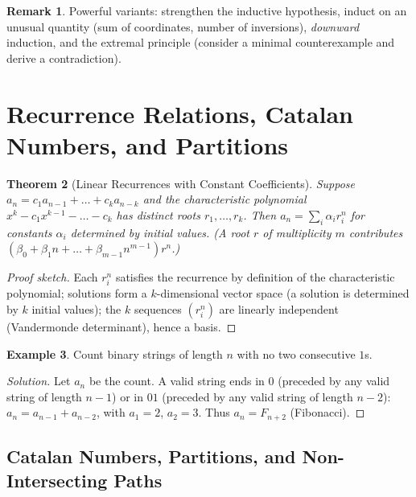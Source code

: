 \documentclass[11pt]{article}
\theoremstyle{plain}
\newtheorem{theorem}{Theorem}[section]
\theoremstyle{definition}
\newtheorem{example}[theorem]{Example}
\newtheorem{remark}[theorem]{Remark}
\newenvironment{solution}{\begin{proof}[Solution]}{\end{proof}}
\begin{document}
\begin{remark}
Powerful variants: strengthen the inductive hypothesis, induct on an unusual quantity (sum of coordinates, number
of inversions), \emph{downward} induction, and the extremal principle
(consider a minimal counterexample and derive a contradiction).
\end{remark}

\section{Recurrence Relations, Catalan Numbers, and Partitions}

\begin{theorem}[Linear Recurrences with Constant Coefficients]
Suppose $a_{n} = c_1 a_{n-1} + \dots + c_k a_{n-k}$ and the characteristic
polynomial $x^k - c_1x^{k-1} - \dots - c_k$ has distinct roots
$r_1,\dots,r_k$. Then $a_n = \sum_i \alpha_i r_i^n$ for constants $\alpha_i$
determined by initial values. (A root $r$ of multiplicity $m$ contributes
$(\beta_0 + \beta_1 n + \dots + \beta_{m-1}n^{m-1})r^n$.)
\end{theorem}
\begin{proof}[Proof sketch]
Each $r_i^n$ satisfies the recurrence by definition of the characteristic
polynomial; solutions form a $k$-dimensional vector space (a solution is
determined by $k$ initial values); the $k$ sequences $(r_i^n)$ are linearly
independent (Vandermonde determinant), hence a basis.
\end{proof}

\begin{example}
Count binary strings of length $n$ with no two consecutive $1$s.
\end{example}
\begin{solution}
Let $a_n$ be the count. A valid string ends in $0$ (preceded by any valid
string of length $n-1$) or in $01$ (preceded by any valid string of length
$n-2$): $a_n = a_{n-1}+a_{n-2}$, with $a_1 = 2$, $a_2 = 3$. Thus
$a_n = F_{n+2}$ (Fibonacci).
\end{solution}

\subsection{Catalan Numbers, Partitions, and Non-Intersecting Paths}
\end{document}
